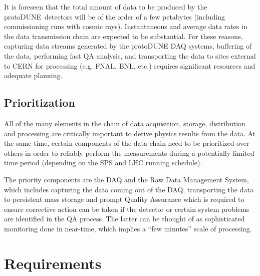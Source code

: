 \documentclass[pdftex,12pt,letter]{article}
\newcommand{\pd}{protoDUNE\ }
\begin{document}
It is foreseen that the total amount of data to be produced by the \pd detectors will be of the order of a few
petabytes (including commissioning runs with cosmic rays). Instantaneous and average data rates in the data transmission chain are expected to be
substantial. For these reasons, capturing data streams generated by the protoDUNE DAQ systems, buffering of the data, performing fast QA analysis,
and transporting the data to sites external to CERN for processing (e.g. FNAL, BNL, etc.) requires significant resources and adequate planning.

\subsection{Prioritization}

All of the many elements in the chain of data acquisition, storage, distribution and processing are critically important to derive physics results  from the data.
At the same time, certain components of the data chain need to be prioritized over others in order to reliably perform the measurements during a potentially
limited time period (depending on the SPS and LHC running schedule).

The priority components are the DAQ and the Raw Data Management System, which includes capturing the data coming out of the DAQ,
transporting the data to persistent mass storage and prompt Quality Assurance which is required to ensure corrective action can be taken
if the detector or certain system problems are identified in the QA process. The latter can be thought of as sophisticated monitoring done in near-time,
which implies a ``few minutes'' scale of processing.

\section{Requirements}
\end{document}
